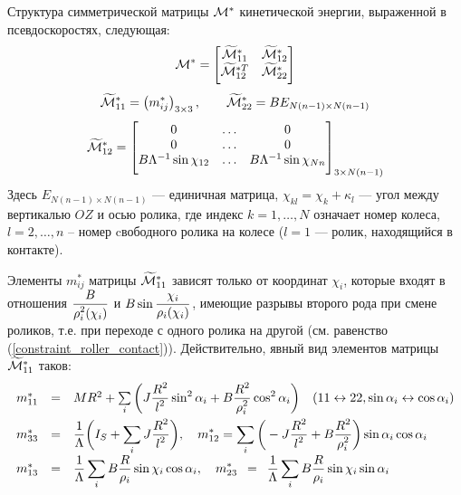 Структура симметрической матрицы $\mathcal{M}^*$ кинетической энергии, выраженной в псевдоскоростях, следующая:
$$
\M^* = 
    \begin{bmatrix}
        \widetilde{\M}^*_{11} & \widetilde{\M}^*_{12} \\
        \widetilde{\M}^{*T}_{12} & \widetilde{\M}^*_{22} \\[4pt]
    \end{bmatrix}
\vsp
$$
$$
\widetilde{\M}^*_{11} = 
    \left(
        m^*_{ij}
    \right)_{3\times3},
\qquad
\widetilde{\M}^*_{22} = 
    BE_{N(n-1) \times N(n-1)}
\vsp
$$
$$
\widetilde{\M}^*_{12} = 
    \begin{bmatrix}
        0&\ldots& 0 \\
        0&\ldots&0 \\
        B\Lambda^{-1}\sin\chi_{12}&\ldots& B\Lambda^{-1}\sin\chi_{Nn}\\[4pt]
    \end{bmatrix}_{3\times N(n-1)}
\vsp
$$
Здесь $E_{N(n-1) \times N(n-1)}$ --- единичная матрица, $\chi_{kl} = \chi_k+\kappa_l$ --- угол между вертикалью $OZ$ и осью ролика, где индекс $k = 1,\dots,N$ означает номер колеса, $l = 2,\ldots, n$ -- номер cвободного ролика на колесе ($l = 1$ --- ролик, находящийся в контакте).

Элементы $m^*_{ij}$ матрицы $\widetilde{\mathcal{M}}^*_{11}$ зависят только от координат $\chi_i$, которые входят в отношения $\displaystyle\frac{\displaystyle B}{\displaystyle \rho_i^2(\chi_i)}$ и $B\sin\displaystyle\frac{\displaystyle \chi_i}{\displaystyle \rho_i(\chi_i)}$, имеющие разрывы второго рода при смене роликов, т.е. при переходе с одного ролика на другой (см. равенство (\ref{constraint_roller_contact})). Действительно, явный вид элементов матрицы $\widetilde{\mathcal{M}}^*_{11}$ таков:
\begin{equation}\label{mstar}
    \begin{array}{rcl}
        m^*_{11} & = & MR^2 + \sum\limits_i \bigg( J\ddfrac{R^2}{l^2}\sin^2\alpha_i + B\ddfrac{R^2}{\rho_i^2}\cos^2\alpha_i\bigg)\quad(11 \leftrightarrow 22, \sin\alpha_i \leftrightarrow \cos\alpha_i)\vsp
        m^*_{33} & = & \ddfrac{1}{\Lambda}\bigg(I_S + \sum\limits_i J\ddfrac{R^2}{l^2}\bigg),\quad
        m^*_{12}  =  \sum\limits_i \bigg(-J\ddfrac{R^2}{l^2} + B\ddfrac{R^2}{\rho_i^2}\bigg)\sin\alpha_i\cos\alpha_i\vsp
        m^*_{13} & = & \ddfrac{1}{\Lambda}\sum\limits_i B\ddfrac{R}{\rho_i}\sin\chi_i\cos\alpha_i,
        \quad
        m^*_{23} \enspace = \enspace \ddfrac{1}{\Lambda}\sum\limits_i B\ddfrac{R}{\rho_i}\sin\chi_i\sin\alpha_i
    \end{array}
\end{equation}

